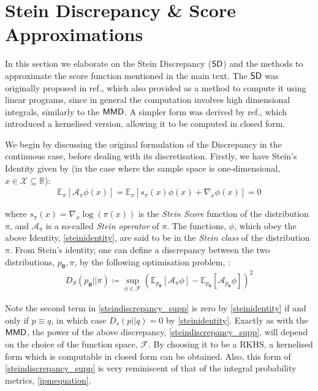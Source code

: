 

\section{Stein Discrepancy \& Score Approximations \label{supp_matt:stein_discrepenancy}}
In this section we elaborate on the Stein Discrepancy ($\operatorname{\textsf{SD}}$) and the methods to approximate the score function mentioned in the main text. The $\operatorname{\textsf{SD}}$ was originally proposed in ref., which also provided as a method to compute it using linear programs, since in general the computation involves high dimensional integrals, similarly to the $\operatorname{\textsf{MMD}}$. A simpler form was derived by ref., which introduced a kernelised version, allowing it to be computed in closed form. 

We begin by discussing the original formulation of the Discrepancy in the continuous case, before dealing with its discretisation. Firstly, we have Stein's Identity given by (in the case where the sample space is one-dimensional, $x\in \mathcal{X} \subseteq \mathbb{R}$):
\begin{align}
    \mathbb{E}_\pi\left[\mathcal{A}_\pi\phi(x)\right] = \mathbb{E}_\pi \left[s_\pi(x)\phi(x)+ \nabla_x\phi(x)\right]  = 0 \label{steinidentity}
\end{align}

where $s_\pi(x) = \nabla_x\log(\pi(x))$ is the \textit{Stein Score} function of the distribution $\pi$, and $\mathcal{A}_\pi$ is a so-called \textit{Stein operator} of $\pi$. The functions, $\phi$, which obey the above Identity, \eqref{steinidentity}, are said to be in the \textit{Stein class} of the distribution $\pi$. From Stein's identity, one can  define a discrepancy  between the two distributions, $p_{\boldsymbol\theta}, \pi$, by the following optimisation problem, :
\begin{align}
    D_S(p_{\boldsymbol\theta}|| \pi)  \coloneqq \sup_{\phi \in \mathcal{F}}\left(\mathbb{E}_{p_{\boldsymbol\theta}}[\mathcal{A}_\pi\phi] - \mathbb{E}_{p_{\boldsymbol\theta}}[\mathcal{A}_{p_{\boldsymbol\theta}}\phi]\right)^2 \label{steindiscrepancy_supp}
\end{align}

Note the second term in \eqref{steindiscrepancy_supp} is zero by \eqref{steinidentity} if and only if $p\equiv q$, in which case $D_s(p||q) = 0$ by \eqref{steinidentity}. Exactly as with the $\operatorname{\textsf{MMD}}$, the power of the above discrepancy, \eqref{steindiscrepancy_supp}, will depend on the choice of the function space, $\mathcal{F}$. By choosing it to be a RKHS, a kernelised form which is computable in closed form can be obtained. Also, this form of \eqref{steindiscrepancy_supp} is very reminiscent of that of the integral probability metrics, \eqref{ipmequation}.

